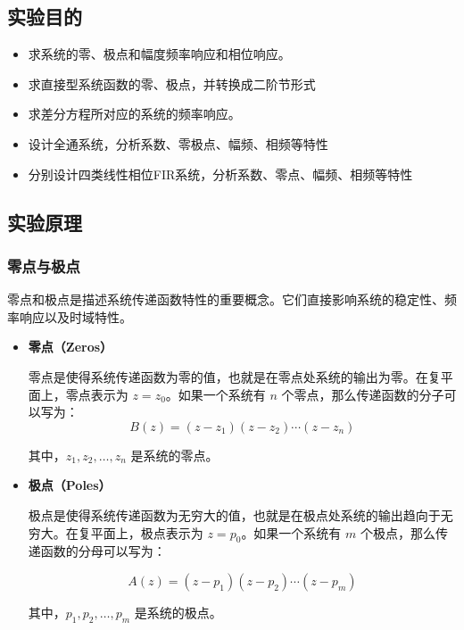 \documentclass[a4paper,12pt]{article}
\begin{document}
\subsection{实验目的}
\begin{itemize}
    \item 求系统的零、极点和幅度频率响应和相位响应。
    \item 求直接型系统函数的零、极点，并转换成二阶节形式
    \item 求差分方程所对应的系统的频率响应。
    \item 设计全通系统，分析系数、零极点、幅频、相频等特性
    \item 分别设计四类线性相位FIR系统，分析系数、零点、幅频、相频等特性
    \cite{ning2012}

\end{itemize}

\subsection{实验原理}
\subsubsection{零点与极点}
零点和极点是描述系统传递函数特性的重要概念。它们直接影响系统的稳定性、频率响应以及时域特性。
\begin{itemize}
    \item \textbf{零点（Zeros）}

    零点是使得系统传递函数为零的值，也就是在零点处系统的输出为零。在复平面上，零点表示为 \( z = z_0 \)。如果一个系统有 \( n \) 个零点，那么传递函数的分子可以写为：
\begin{equation}
    B(z) = (z - z_1)(z - z_2) \cdots (z - z_n)
\end{equation}

其中，\( z_1, z_2, \ldots, z_n \) 是系统的零点。

    \item \textbf{极点（Poles）}

    极点是使得系统传递函数为无穷大的值，也就是在极点处系统的输出趋向于无穷大。在复平面上，极点表示为 \( z = p_0 \)。如果一个系统有 \( m \) 个极点，那么传递函数的分母可以写为：

\begin{equation}
    A(z) = (z - p_1)(z - p_2) \cdots (z - p_m)
\end{equation}

其中，\( p_1, p_2, \ldots, p_m \) 是系统的极点。

    
\end{itemize}
\end{document}
